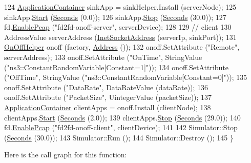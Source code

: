 \begin{DoxyCode}
124   \hyperlink{classns3_1_1ApplicationContainer}{ApplicationContainer} sinkApp = sinkHelper.Install (serverNode);
125   sinkApp.\hyperlink{classns3_1_1ApplicationContainer_a8eff87926507020bbe3e1390358a54a7}{Start} (\hyperlink{group__timecivil_ga33c34b816f8ff6628e33d5c8e9713b9e}{Seconds} (0.0));
126   sinkApp.\hyperlink{classns3_1_1ApplicationContainer_adfc52f9aa4020c8714679b00bbb9ddb3}{Stop} (\hyperlink{group__timecivil_ga33c34b816f8ff6628e33d5c8e9713b9e}{Seconds} (30.0));
127   fd.\hyperlink{classns3_1_1PcapHelperForDevice_a74866def9a881aa9d5c5be1225a26722}{EnablePcap} (\textcolor{stringliteral}{"fd2fd-onoff-server"}, serverDevice);
128 
129   \textcolor{comment}{// client}
130   AddressValue serverAddress (\hyperlink{classns3_1_1InetSocketAddress}{InetSocketAddress} (serverIp, sinkPort));
131   \hyperlink{classns3_1_1OnOffHelper}{OnOffHelper} onoff (factory, \hyperlink{classns3_1_1Address}{Address} ());
132   onoff.SetAttribute (\textcolor{stringliteral}{"Remote"}, serverAddress);
133   onoff.SetAttribute (\textcolor{stringliteral}{"OnTime"}, StringValue (\textcolor{stringliteral}{"ns3::ConstantRandomVariable[Constant=1]"}));
134   onoff.SetAttribute (\textcolor{stringliteral}{"OffTime"}, StringValue (\textcolor{stringliteral}{"ns3::ConstantRandomVariable[Constant=0]"}));
135   onoff.SetAttribute (\textcolor{stringliteral}{"DataRate"}, DataRateValue (dataRate));
136   onoff.SetAttribute (\textcolor{stringliteral}{"PacketSize"}, UintegerValue (packetSize));
137   \hyperlink{classns3_1_1ApplicationContainer}{ApplicationContainer} clientApps = onoff.Install (clientNode);
138   clientApps.\hyperlink{classns3_1_1ApplicationContainer_a8eff87926507020bbe3e1390358a54a7}{Start} (\hyperlink{group__timecivil_ga33c34b816f8ff6628e33d5c8e9713b9e}{Seconds} (2.0));
139   clientApps.\hyperlink{classns3_1_1ApplicationContainer_adfc52f9aa4020c8714679b00bbb9ddb3}{Stop} (\hyperlink{group__timecivil_ga33c34b816f8ff6628e33d5c8e9713b9e}{Seconds} (29.0));
140   fd.\hyperlink{classns3_1_1PcapHelperForDevice_a74866def9a881aa9d5c5be1225a26722}{EnablePcap} (\textcolor{stringliteral}{"fd2fd-onoff-client"}, clientDevice);
141 
142   Simulator::Stop (\hyperlink{group__timecivil_ga33c34b816f8ff6628e33d5c8e9713b9e}{Seconds} (30.0));
143   Simulator::Run ();
144   Simulator::Destroy ();
145 \}
\end{DoxyCode}


Here is the call graph for this function\+:


